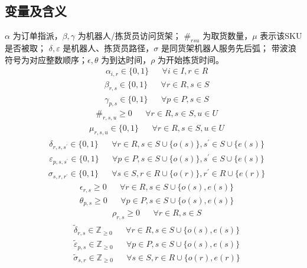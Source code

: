 \documentclass[UTF8,11pt]{ctexart}
\begin{document}
\subsection*{变量及含义}
$\alpha$ 为订单指派，$\beta,\gamma$ 为机器人/拣货员访问货架；
$\#_{rsu}$ 为取货数量，$\mu$ 表示该SKU是否被取；
$\delta,\varepsilon$ 是机器人、拣货员路径，$\sigma$ 是同货架机器人服务先后弧；
带波浪符号为对应整数顺序；$\epsilon,\theta$ 为到达时间，$\rho$ 为开始拣货时间。
\[\begin{aligned}&\alpha_{i, r} \in \{0, 1\} && \forall i \in I, r \in R\end{aligned}\]
\[\begin{aligned}&\beta_{r, s} \in \{0, 1\} && \forall r \in R, s \in S\end{aligned}\]
\[\begin{aligned}&\gamma_{p, s} \in \{0, 1\} && \forall p \in P, s \in S\end{aligned}\]
\[\begin{aligned}&\#_{r, s, u} \ge 0 && \forall r \in R, s \in S, u \in U\end{aligned}\]
\[\begin{aligned}&\mu_{r, s, u} \in \{0, 1\} && \forall r \in R, s \in S, u \in U\end{aligned}\]
\[\begin{aligned}&\delta_{r, s, s^{\prime}} \in \{0, 1\} && \forall r \in R, s \in S \cup \{o(s)\}, s^{\prime} \in S \cup \{e(s)\}\end{aligned}\]
\[\begin{aligned}&\varepsilon_{p, s, s^{\prime}} \in \{0, 1\} && \forall p \in P, s \in S \cup \{o(s)\}, s^{\prime} \in S \cup \{e(s)\}\end{aligned}\]
\[\begin{aligned}&\sigma_{s, r, r^{\prime}} \in \{0, 1\} && \forall s \in S, r \in R \cup \{o(r)\}, r^{\prime} \in R \cup \{e(r)\}\end{aligned}\]
\[\begin{aligned}&\epsilon_{r, s} \ge 0 && \forall r \in R, s \in S \cup \{o(s), e(s)\}\end{aligned}\]
\[\begin{aligned}&\theta_{p, s} \ge 0 && \forall p \in P, s \in S \cup \{o(s), e(s)\}\end{aligned}\]
\[\begin{aligned}&\rho_{r, s} \ge 0 && \forall r \in R, s \in S\end{aligned}\]
\[\begin{aligned}&\tilde{\delta}_{r, s} \in \mathbb{Z}_{\ge0} && \forall r \in R, s \in S \cup \{o(s), e(s)\}\end{aligned}\]
\[\begin{aligned}&\tilde{\varepsilon}_{p, s} \in \mathbb{Z}_{\ge0} && \forall p \in P, s \in S \cup \{o(s), e(s)\}\end{aligned}\]
\[\begin{aligned}&\tilde{\sigma}_{s, r} \in \mathbb{Z}_{\ge0} && \forall s \in S, r \in R \cup \{o(r), e(r)\}\end{aligned}\]
\end{document}
